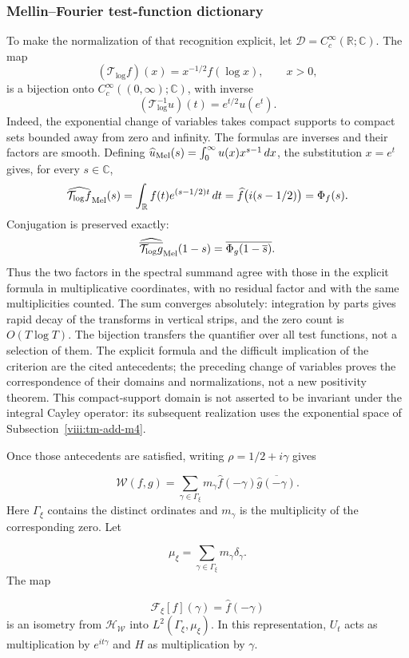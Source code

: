 \subsubsection*{Mellin--Fourier test-function dictionary}
\label{viii:rz:mellin-fourier}
To make the normalization of that recognition explicit, let
\(\mathcal D=C_c^\infty(\mathbb R;\mathbb C)\). The map
\[
 (\mathcal T_{\log}f)(x)=x^{-1/2}f(\log x),\qquad x>0,
\]
is a bijection onto \(C_c^\infty((0,\infty);\mathbb C)\), with inverse
\[
 (\mathcal T_{\log}^{-1}u)(t)=e^{t/2}u(e^t).
\]
Indeed, the exponential change of variables takes compact supports to compact sets
bounded away from zero and infinity. The formulas are inverses and their factors
are smooth. Defining
\(\widehat u_{\rm Mel}(s)=\int_0^\infty u(x)x^{s-1}\,dx\),
the substitution \(x=e^t\) gives, for every \(s\in\mathbb C\),
\[
 \widehat{\mathcal T_{\log}f}_{\rm Mel}(s)
 =\int_{\mathbb R}f(t)e^{(s-1/2)t}\,dt
 =\widehat f\bigl(i(s-1/2)\bigr)=\Phi_f(s).
\]
Conjugation is preserved exactly:
\[
 \widehat{\overline{\mathcal T_{\log}g}}_{\rm Mel}(1-s)
 =\overline{\Phi_g(1-\overline s)}.
\]
Thus the two factors in the spectral summand agree with those in the
explicit formula in multiplicative coordinates, with no residual factor
and with the same multiplicities counted. The sum converges absolutely:
integration by parts gives rapid decay of the transforms
in vertical strips, and the zero count is \(O(T\log T)\).
The bijection transfers the quantifier over all test functions, not a
selection of them. The explicit formula and the difficult implication of the
criterion are the cited antecedents; the preceding change of variables
proves the correspondence of their domains and normalizations, not a new
positivity theorem. This compact-support domain is not asserted to be invariant under
the integral Cayley operator: its subsequent realization uses the exponential space
of Subsection~\ref{viii:tm-add-m4}.

Once those antecedents are satisfied, writing \(\rho=1/2+i\gamma\) gives

\[
\mathscr W(f,g)
=\sum_{\gamma\in\Gamma_\xi}
m_\gamma\widehat f(-\gamma)\overline{\widehat g(-\gamma)}.
\]
Here \(\Gamma_\xi\) contains the distinct ordinates and \(m_\gamma\) is the multiplicity of the corresponding zero. Let

\[
\mu_\xi=\sum_{\gamma\in\Gamma_\xi}m_\gamma\delta_\gamma.
\]
The map

\[
\mathcal F_\xi[f](\gamma)=\widehat f(-\gamma)
\]
is an isometry from \(\mathcal H_{\mathscr W}\) into \(L^2(\Gamma_\xi,\mu_\xi)\). In this representation, \(U_t\) acts as multiplication by \(e^{it\gamma}\) and \(H\) as multiplication by \(\gamma\).

